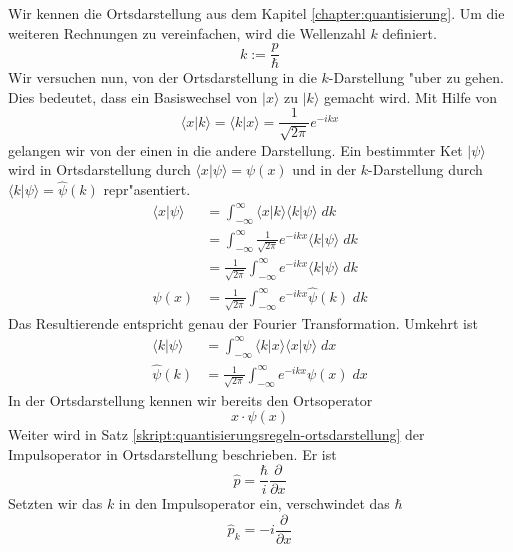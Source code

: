 \begin{refsection}
Wir kennen die Ortsdarstellung aus dem Kapitel \ref{chapter:quantisierung}.
Um die weiteren Rechnungen zu vereinfachen, wird die Wellenzahl $k$ definiert.
\begin{equation}
k := \frac{p}{\hbar}
\end{equation}
Wir versuchen nun, von der Ortsdarstellung in die $k$-Darstellung "uber zu gehen.
Dies bedeutet, dass ein Basiswechsel von $\vert x\rangle$ zu $\vert k\rangle$ gemacht wird.
Mit Hilfe von
\begin{equation}
\langle x\vert k\rangle= \langle k\vert x\rangle =\frac{1}{\sqrt{2\pi }}e^{-ikx} 
\end{equation}
gelangen wir von der einen in die andere Darstellung.
Ein bestimmter Ket $|\psi\rangle$ wird in Ortsdarstellung durch $\langle x\vert \psi\rangle = \psi(x)$ und in der $k$-Darstellung durch $\langle k\vert \psi\rangle = \hat{\psi}(k)$ repr"asentiert.
\begin{align}
\langle x\vert \psi\rangle &= \int_{-\infty}^{\infty} \langle x\vert k\rangle \langle k\vert \psi\rangle \; dk\\
&=\int_{-\infty}^{\infty} \frac{1}{\sqrt{2\pi }}e^{-ikx}  \langle k\vert \psi\rangle \; dk\\
&= \frac{1}{\sqrt{2\pi }} \int_{-\infty}^{\infty} e^{-ikx}  \langle k\vert \psi\rangle \; dk\\
\psi(x) &= \frac{1}{\sqrt{2\pi }} \int_{-\infty}^{\infty} e^{-ikx} \hat{\psi}(k) \; dk
\end{align}
Das Resultierende entspricht genau der Fourier Transformation.
Umkehrt ist
\begin{align}
\langle k\vert \psi\rangle &= \int_{-\infty}^{\infty} \langle k\vert x\rangle \langle x\vert \psi\rangle \; dx\\
\hat{\psi}(k) &= \frac{1}{\sqrt{2\pi}} \int_{-\infty}^{\infty} e^{-ikx} {\psi}(x) \; dx
\end{align}
In der Ortsdarstellung kennen wir bereits den Ortsoperator
\begin{equation}
 x \cdot\psi(x)
\end{equation}
Weiter wird in Satz \ref{skript:quantisierungsregeln-ortsdarstellung} der Impulsoperator in Ortsdarstellung beschrieben. Er ist
\begin{equation}
 \hat p  =\frac{\hbar}{i}\frac{\partial}{\partial x}
\end{equation}
Setzten wir das $k$ in den Impulsoperator ein, verschwindet das $\hbar$
\begin{equation}
\hat p_{k} = -i\frac{\partial}{\partial x}

\end{equation}
\end{refsection}
